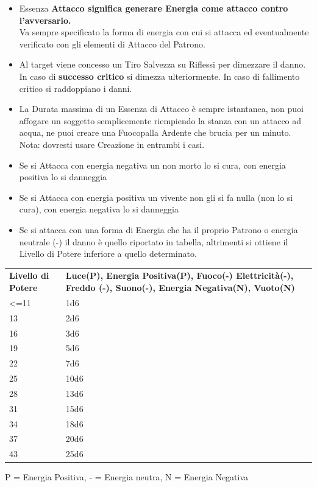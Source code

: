 \documentclass[a4paper,11pt,twoside,openany]{book}
\begin{document}
\label{essenza-attacco---intelletto}
\begin{itemize}
	\item
     Essenza \textbf{Attacco significa generare Energia come attacco contro l'avversario.}\\
Va sempre specificato la forma di energia con cui si attacca ed eventualmente verificato con gli elementi di Attacco del Patrono.
	\item
Al target viene concesso un Tiro Salvezza su Riflessi per dimezzare il danno. In caso di \textbf{successo critico} si dimezza ulteriormente. In caso di fallimento critico si raddoppiano i danni.
	\item
La Durata massima di un Essenza di Attacco è sempre istantanea, non puoi affogare un soggetto semplicemente riempiendo la stanza con un attacco ad acqua, ne puoi creare una Fuocopalla Ardente che brucia per un minuto.
Nota: dovresti usare Creazione in entrambi i casi.		
	\item
Se si Attacca con energia negativa un non morto lo si cura, con energia positiva lo si danneggia
	\item
Se si Attacca con energia positiva un vivente non gli si fa nulla (non lo si cura), con energia negativa lo si danneggia
	\item
Se si attacca con una forma di Energia che ha il proprio Patrono o energia neutrale (-) il danno è quello riportato in tabella, altrimenti si ottiene il Livello di Potere inferiore a quello determinato.
\end{itemize}

\bigskip

\begin{tabularx}{\textwidth}{lX}
	\toprule
	\textbf{Livello di Potere} & \textbf{Luce(P), Energia Positiva(P), Fuoco(-) Elettricità(-), Freddo (-), Suono(-), Energia Negativa(N), Vuoto(N)}\tabularnewline
	<=11                       & 1d6\tabularnewline
	13                         & 2d6\tabularnewline
	16                         & 3d6\tabularnewline
	19                         & 5d6\tabularnewline
	22                         & 7d6\tabularnewline
	25                         & 10d6\tabularnewline
	28                         & 13d6\tabularnewline
	31                         & 15d6\tabularnewline
	34                         & 18d6\tabularnewline
	37                         & 20d6\tabularnewline
	43                         & 25d6\tabularnewline
\end{tabularx}

P = Energia Positiva, - = Energia neutra, N = Energia Negativa
\bigskip
\end{document}
